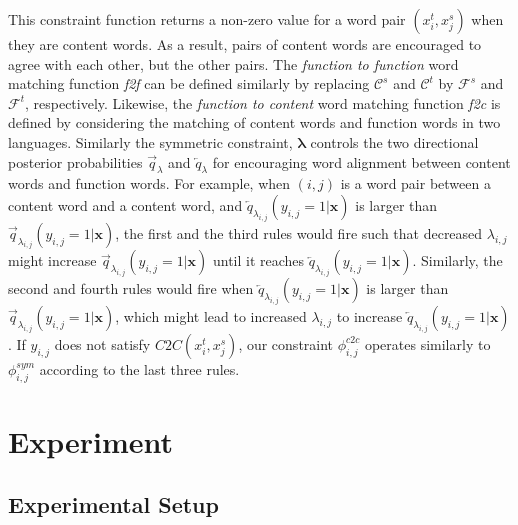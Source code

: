 \documentclass[english]{jnlp_1.4}
\begin{document}
This constraint function returns a non-zero value for a word pair $(x^t_i, x^s_j)$ when they are content words.
As a result, pairs of content words are encouraged to agree with each other, but the other pairs.
The \textit{function to function} word matching function \textit{f2f} can be defined similarly by replacing $\mathcal{C}^s$ and $\mathcal{C}^t$ by $\mathcal{F}^s$ and $\mathcal{F}^t$, respectively. 
Likewise, the \textit{function to content} word matching function \textit{f2c} is defined by considering the  matching of content words and function words in two languages.
Similarly the symmetric constraint, $\boldsymbol{\lambda}$ controls the two directional posterior probabilities $\overrightarrow{q}_{\lambda}$ and $\overleftarrow{q}_{\lambda}$ for encouraging  word alignment between content words and function words.
For example, when $(i,j)$ is a word pair between a content word and a content word,
and $\overleftarrow{q}_{\lambda_{i,j}}(y_{i,j}=1|\boldsymbol{x})$ is larger than $\overrightarrow{q}_{\lambda_{i,j}}(y_{i,j}=1|\boldsymbol{x})$, 
the first and the third rules would fire such that decreased $\lambda_{i,j}$
might increase $\overrightarrow{q}_{\lambda_{i,j}}(y_{i,j}=1|\boldsymbol{x})$
until it reaches $\overleftarrow{q}_{\lambda_{i,j}}(y_{i,j}=1|\boldsymbol{x})$.
Similarly, the second and fourth rules would fire when $\overleftarrow{q}_{\lambda_{i,j}}(y_{i,j}=1|\boldsymbol{x})$ is larger than $\overrightarrow{q}_{\lambda_{i,j}}(y_{i,j}=1|\boldsymbol{x})$, which might lead to increased $\lambda_{i,j}$ to increase $\overleftarrow{q}_{\lambda_{i,j}}(y_{i,j}=1|\boldsymbol{x})$.
If $y_{i,j}$ does not satisfy $\mathit{C2C}(x^t_i, x^s_j)$, our constraint $\phi^{\mathit{c2c}}_{i, j}$ operates similarly to $\phi^{\mathit{sym}}_{i, j}$ according to the last three rules. 


\section{Experiment}
\label{sec:experiment}

\subsection{Experimental Setup}
\end{document}

